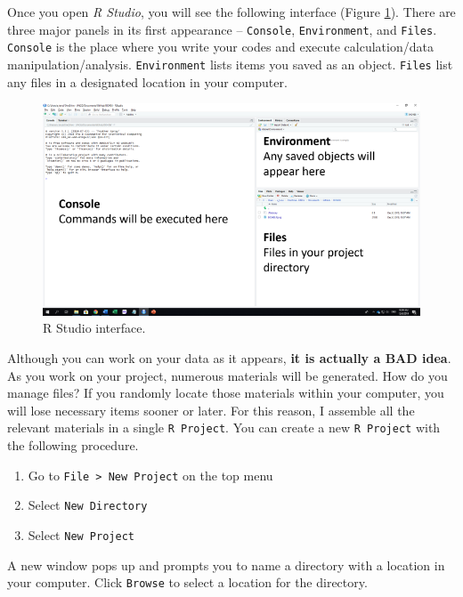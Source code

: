 \documentclass[
]{book}
\providecommand{\tightlist}{%
  \setlength{\itemsep}{0pt}\setlength{\parskip}{0pt}}
\begin{document}
Once you open \emph{R Studio}, you will see the following interface (Figure \ref{fig:ui}). There are three major panels in its first appearance -- \texttt{Console}, \texttt{Environment}, and \texttt{Files}. \texttt{Console} is the place where you write your codes and execute calculation/data manipulation/analysis. \texttt{Environment} lists items you saved as an object. \texttt{Files} list any files in a designated location in your computer.

\begin{figure}

{\centering \includegraphics[width=9.47in]{image/r_image01} 

}

\caption{R Studio interface.}\label{fig:ui}
\end{figure}

Although you can work on your data as it appears, \textbf{it is actually a BAD idea}. As you work on your project, numerous materials will be generated. How do you manage files? If you randomly locate those materials within your computer, you will lose necessary items sooner or later. For this reason, I assemble all the relevant materials in a single \texttt{R\ Project}. You can create a new \texttt{R\ Project} with the following procedure.

\begin{enumerate}
\def\labelenumi{\alph{enumi}.}
\tightlist
\item
  Go to \texttt{File\ \textgreater{}\ New\ Project} on the top menu
\item
  Select \texttt{New\ Directory}
\item
  Select \texttt{New\ Project}
\end{enumerate}

A new window pops up and prompts you to name a directory with a location in your computer. Click \texttt{Browse} to select a location for the directory.
\end{document}
